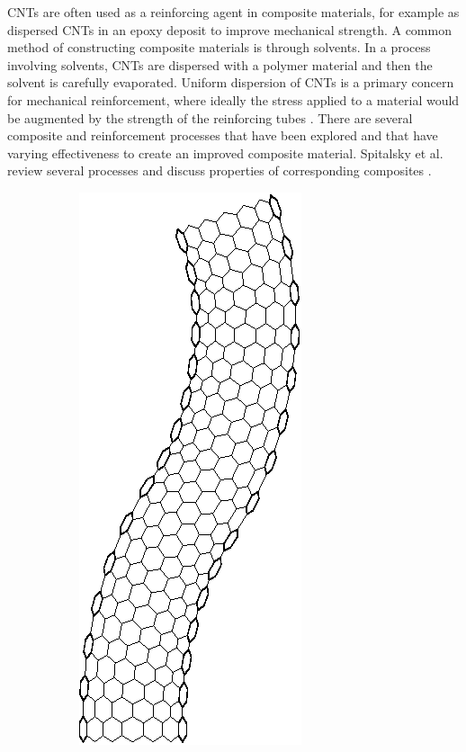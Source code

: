 CNTs are often used as a reinforcing agent in composite materials, for example as dispersed CNTs in an epoxy deposit to improve mechanical strength.
A common method of constructing composite materials is through solvents.
In a process involving solvents, CNTs are dispersed with a polymer material and then the solvent is carefully evaporated.
Uniform dispersion of CNTs is a primary concern for mechanical reinforcement, where ideally the stress applied to a material would be augmented by the strength of the reinforcing tubes \cite{Coleman2006}.
There are several composite and reinforcement processes that have been explored and that have varying effectiveness to create an improved composite material.
Spitalsky et al. review several processes and discuss properties of corresponding composites \cite{Spitalsky2010}.

\begin{figure}[t!]
		\centering
		\begin{subfigure}[t]{.33\textwidth}
			\centering
			\includegraphics{./fig/ch1/Nanotube.eps}
			\caption{\label{subfig:Nanotube}}
		\end{subfigure}%

\end{figure}
